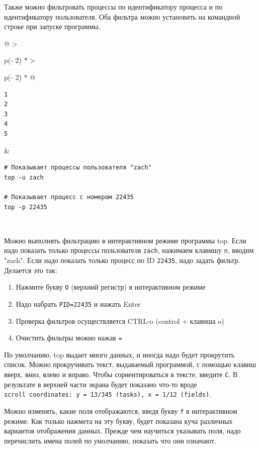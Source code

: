 \documentclass{article}
\begin{document}
Также можно фильтровать процессы по идентификатору процесса и по
идентификатору пользователя. Оба фильтра можно установить на командной
строке при запуске программы.

\begin{longtable}[]{@{}
  >{\raggedright\arraybackslash}p{(\columnwidth - 2\tabcolsep) * }
  >{\raggedright\arraybackslash}p{(\columnwidth - 2\tabcolsep) * }@{}}
\toprule
\endhead
\begin{minipage}[t]{\linewidth}\raggedright
\begin{verbatim}
1
2
3
4
5
\end{verbatim}
\end{minipage} & \begin{minipage}[t]{\linewidth}\raggedright
\begin{verbatim}
# Показывает процессы пользователя "zach"
top -u zach

# Показывает процесс с номером 22435
top -p 22435
\end{verbatim}
\end{minipage} \\ \addlinespace
\bottomrule
\end{longtable}

Можно выполнять фильтрацию в интерактивном режиме программы top. Если
надо показать только процессы пользователя \texttt{zach}, нажимаем
клавмшу \texttt{n}, вводим "zach". Если надо показать только процесс по
ID \texttt{22435}, надо задать фильтр. Делается это так:

\begin{enumerate}
\tightlist
\item
  Нажмите букву \texttt{O} (верхний регистр) в интерактивном режиме
\item
  Надо набрать \texttt{PID=22435} и нажать Enter
\item
  Проверка фильтров осуществляется CTRL-o (control + клавиша o)
\item
  Очистить фильтры можно нажав \texttt{=}
\end{enumerate}

По умолчанию, top выдает много данных, и иногда надо будет прокрутить
список. Можно прокручивать текст, выдаваемый программой, с помощью
клавиш вверх, вниз, влево и вправо. Чтобы сориентироваться в тексте,
введите \texttt{C}. В результате в верхней части экрана будет показано
что-то вроде
\texttt{scroll\ coordinates:\ y\ =\ 13/345\ (tasks),\ x\ =\ 1/12\ (fields)}.

Можно изменять, какие поля отображаются, введя букву \texttt{f} в
интерактивном режиме. Как только нажмета на эту букву, будет показана
куча различных вариантов отображения данных. Прежде чем научиться
указывать поля, надо перечислить имена полей по умолчанию, показать что
они означают.
\end{document}
